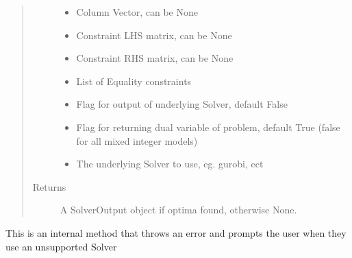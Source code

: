\documentclass[letterpaper,10pt,english]{sphinxmanual}
\begin{document}
\begin{fulllineitems}
\begin{quote}
\begin{description}
\begin{itemize}
\item {} 
\sphinxAtStartPar
{} \textendash{} Column Vector, can be None

\item {} 
\sphinxAtStartPar
{} \textendash{} Constraint LHS matrix, can be None

\item {} 
\sphinxAtStartPar
{} \textendash{} Constraint RHS matrix, can be None

\item {} 
\sphinxAtStartPar
{} \textendash{} List of Equality constraints

\item {} 
\sphinxAtStartPar
{} \textendash{} Flag for output of underlying Solver, default False

\item {} 
\sphinxAtStartPar
{} \textendash{} Flag for returning dual variable of problem, default True (false for all mixed integer models)

\item {} 
\sphinxAtStartPar
{} \textendash{} The underlying Solver to use, eg. gurobi, ect

\end{itemize}

\item[{Returns}] \leavevmode
\sphinxAtStartPar
A SolverOutput object if optima found, otherwise None.

\end{description}\end{quote}

\end{fulllineitems}


\begin{fulllineitems}
\label{\detokenize{ppopt.solver_interface:ppopt.solver_interface.solver_interface.solver_not_supported}}
\sphinxAtStartPar
This is an internal method that throws an error and prompts the user when they use an unsupported Solver

\end{fulllineitems}
\end{document}
